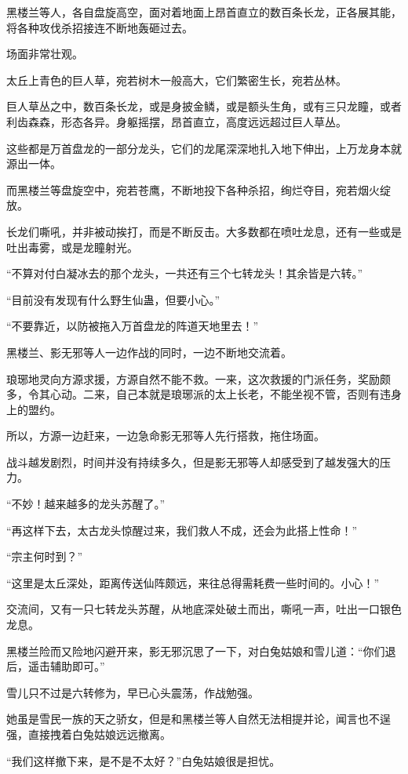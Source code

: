 \begin{this_body}
黑楼兰等人，各自盘旋高空，面对着地面上昂首直立的数百条长龙，正各展其能，将各种攻伐杀招接连不断地轰砸过去。

场面非常壮观。

太丘上青色的巨人草，宛若树木一般高大，它们繁密生长，宛若丛林。

巨人草丛之中，数百条长龙，或是身披金鳞，或是额头生角，或有三只龙瞳，或者利齿森森，形态各异。身躯摇摆，昂首直立，高度远远超过巨人草丛。

这些都是万首盘龙的一部分龙头，它们的龙尾深深地扎入地下伸出，上万龙身本就源出一体。

而黑楼兰等盘旋空中，宛若苍鹰，不断地投下各种杀招，绚烂夺目，宛若烟火绽放。

长龙们嘶吼，并非被动挨打，而是不断反击。大多数都在喷吐龙息，还有一些或是吐出毒雾，或是龙瞳射光。

“不算对付白凝冰去的那个龙头，一共还有三个七转龙头！其余皆是六转。”

“目前没有发现有什么野生仙蛊，但要小心。”

“不要靠近，以防被拖入万首盘龙的阵道天地里去！”

黑楼兰、影无邪等人一边作战的同时，一边不断地交流着。

琅琊地灵向方源求援，方源自然不能不救。一来，这次救援的门派任务，奖励颇多，令其心动。二来，自己本就是琅琊派的太上长老，不能坐视不管，否则有违身上的盟约。

所以，方源一边赶来，一边急命影无邪等人先行搭救，拖住场面。

战斗越发剧烈，时间并没有持续多久，但是影无邪等人却感受到了越发强大的压力。

“不妙！越来越多的龙头苏醒了。”

“再这样下去，太古龙头惊醒过来，我们救人不成，还会为此搭上性命！”

“宗主何时到？”

“这里是太丘深处，距离传送仙阵颇远，来往总得需耗费一些时间的。小心！”

交流间，又有一只七转龙头苏醒，从地底深处破土而出，嘶吼一声，吐出一口银色龙息。

黑楼兰险而又险地闪避开来，影无邪沉思了一下，对白兔姑娘和雪儿道：“你们退后，遥击辅助即可。”

雪儿只不过是六转修为，早已心头震荡，作战勉强。

她虽是雪民一族的天之骄女，但是和黑楼兰等人自然无法相提并论，闻言也不逞强，直接拽着白兔姑娘远远撤离。

“我们这样撤下来，是不是不太好？”白兔姑娘很是担忧。


\end{this_body}
